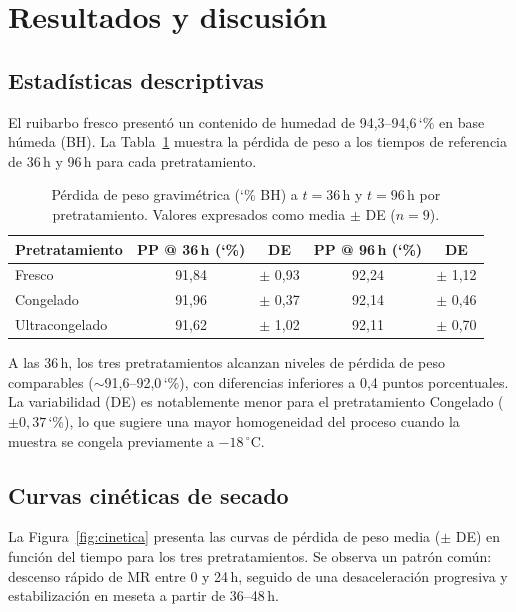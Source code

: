 \documentclass[12pt, a4paper]{article}
\newcommand{\pct}{\char`\%}
\begin{document}
\section{Resultados y discusión}

\subsection{Estadísticas descriptivas}

El ruibarbo fresco presentó un contenido de humedad de 94{,}3--94{,}6\,\pct{} en base húmeda (BH). La Tabla~\ref{tab:descriptivas} muestra la pérdida de peso a los tiempos de referencia de 36\,h y 96\,h para cada pretratamiento.

\begin{table}[H]
\centering
\caption{Pérdida de peso gravimétrica (\pct{} BH) a $t = 36$\,h y $t = 96$\,h por pretratamiento. Valores expresados como media $\pm$ DE ($n = 9$).}
\label{tab:descriptivas}
\begin{tabular}{@{}lcccc@{}}
\toprule
\textbf{Pretratamiento} & \textbf{PP @ 36\,h (\pct{})} & \textbf{DE} & \textbf{PP @ 96\,h (\pct{})} & \textbf{DE} \\
\midrule
Fresco         & 91,84 & $\pm$ 0,93 & 92,24 & $\pm$ 1,12 \\
Congelado      & 91,96 & $\pm$ 0,37 & 92,14 & $\pm$ 0,46 \\
Ultracongelado & 91,62 & $\pm$ 1,02 & 92,11 & $\pm$ 0,70 \\
\bottomrule
\end{tabular}
\end{table}

A las 36\,h, los tres pretratamientos alcanzan niveles de pérdida de peso comparables ($\sim$91{,}6--92{,}0\,\pct{}), con diferencias inferiores a 0{,}4 puntos porcentuales. La variabilidad (DE) es notablemente menor para el pretratamiento Congelado ($\pm 0{,}37$\,\pct{}), lo que sugiere una mayor homogeneidad del proceso cuando la muestra se congela previamente a $-18\,^\circ$C.

\subsection{Curvas cinéticas de secado}

La Figura~\ref{fig:cinetica} presenta las curvas de pérdida de peso media ($\pm$ DE) en función del tiempo para los tres pretratamientos. Se observa un patrón común: descenso rápido de MR entre 0 y 24\,h, seguido de una desaceleración progresiva y estabilización en meseta a partir de 36--48\,h.
\end{document}
